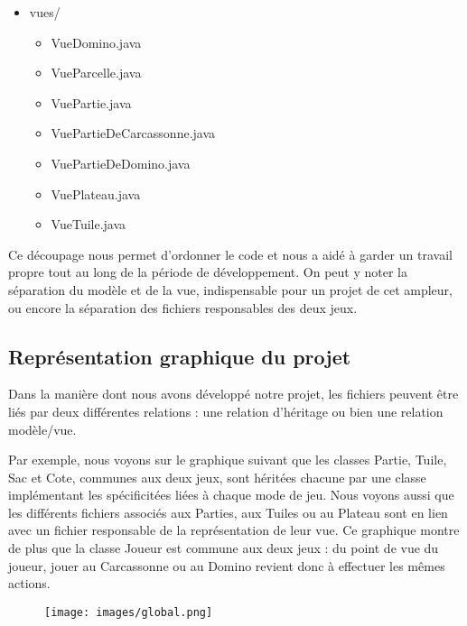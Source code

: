 \documentclass{article}
\begin{document}
\begin{itemize}
\begin{itemize}
        \item vues/
        \begin{itemize}        
        \item VueDomino.java
        \item VueParcelle.java
        \item VuePartie.java
        \item VuePartieDeCarcassonne.java
        \item VuePartieDeDomino.java
        \item VuePlateau.java
        \item VueTuile.java
    \end{itemize}
    \end{itemize}
\end{itemize}

Ce découpage nous permet d'ordonner le code et nous a aidé à garder un travail propre tout au long de la période de développement. On peut y noter la séparation du modèle et de la vue, indispensable pour un projet de cet ampleur, ou encore la séparation des fichiers responsables des deux jeux.

\subsection{Représentation graphique du projet}
Dans la manière dont nous avons développé notre projet, les fichiers peuvent être liés par deux différentes relations : une relation d'héritage ou bien une relation modèle/vue. 

Par exemple, nous voyons sur le graphique suivant que les classes Partie, Tuile, Sac et Cote, communes aux deux jeux, sont héritées chacune par une classe implémentant les spécificitées liées à chaque mode de jeu. Nous voyons aussi que les différents fichiers associés aux Parties, aux Tuiles ou au Plateau sont en lien avec un fichier responsable de la représentation de leur vue. Ce graphique montre de plus que la classe Joueur est commune aux deux jeux : du point de vue du joueur, jouer au Carcassonne ou au Domino revient donc à effectuer les mêmes actions.

\begin{figure}[t]
\centerline{\texttt{[image: images/global.png]}}
\end{figure}
	
\end{document}
